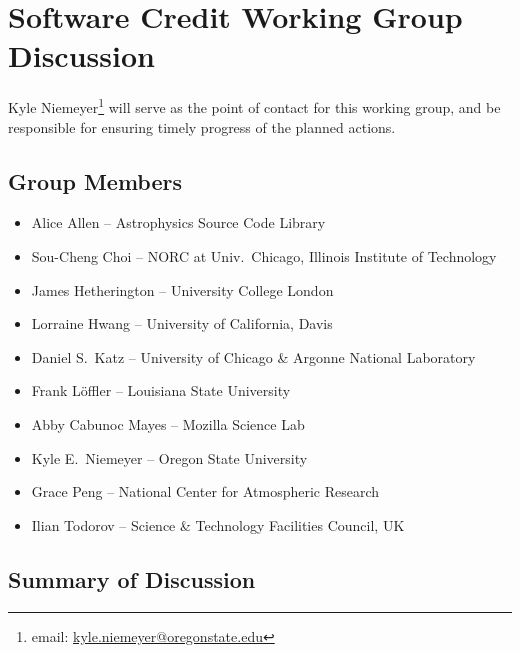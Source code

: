 \section{Software Credit Working Group Discussion}
\label{sec:appendix_SW_credit}

Kyle Niemeyer\footnote{email: \href{mailto:kyle.niemeyer@oregonstate.edu}{kyle.niemeyer@oregonstate.edu}} will serve as the point of contact for this working group, and be responsible for ensuring timely progress of the planned actions.

\subsection{Group Members}

\begin{itemize}
\item Alice Allen -- Astrophysics Source Code Library
\item Sou-Cheng Choi -- NORC at Univ.\ Chicago, Illinois Institute of Technology
\item James Hetherington -- University College London
\item Lorraine Hwang -- University of California, Davis
\item Daniel S.\ Katz -- University of Chicago \& Argonne National Laboratory
\item Frank Löffler -- Louisiana State University
\item Abby Cabunoc Mayes -- Mozilla Science Lab
\item Kyle E.\ Niemeyer -- Oregon State University
\item Grace Peng -- National Center for Atmospheric Research
\item Ilian Todorov -- Science \& Technology Facilities Council, UK
\end{itemize}


\subsection{Summary of Discussion}


